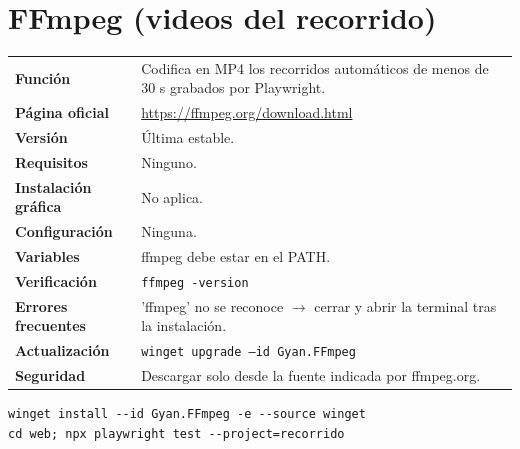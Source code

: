 \section{FFmpeg (videos del recorrido)}
{\small\begin{tabularx}{\linewidth}{@{}>{\bfseries}p{2.9cm}X@{}}\toprule
Función & Codifica en MP4 los recorridos automáticos de menos de 30 s grabados por Playwright.\\
Página oficial & \url{https://ffmpeg.org/download.html}\\
Versión & Última estable.\\
Requisitos & Ninguno.\\
Instalación gráfica & No aplica.\\
Configuración & Ninguna.\\
Variables & ffmpeg debe estar en el PATH.\\
Verificación & \texttt{ffmpeg -version}\\
Errores frecuentes & 'ffmpeg' no se reconoce $\rightarrow$ cerrar y abrir la terminal tras la instalación.\\
Actualización & \texttt{winget upgrade --id Gyan.FFmpeg}\\
Seguridad & Descargar solo desde la fuente indicada por ffmpeg.org.\\
\bottomrule\end{tabularx}}
\begin{lstlisting}[style=ps]
winget install --id Gyan.FFmpeg -e --source winget
cd web; npx playwright test --project=recorrido
\end{lstlisting}

